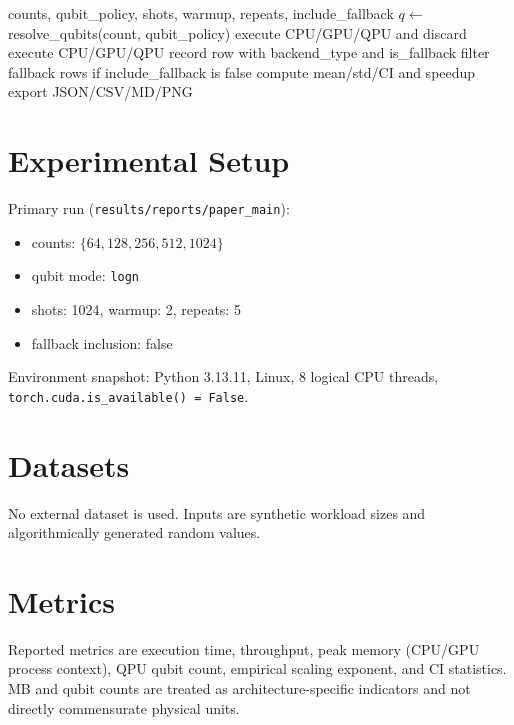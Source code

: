 \documentclass[10pt,conference]{IEEEtran}
\begin{document}
\begin{algorithm}[t]
\caption{Repeated Cross-Platform RNG Benchmark}
\begin{algorithmic}[1]
\Require counts, qubit\_policy, shots, warmup, repeats, include\_fallback
  \State $q \gets$ resolve\_qubits(count, qubit\_policy)
    \State execute CPU/GPU/QPU and discard
  \EndFor
    \State execute CPU/GPU/QPU
    \State record row with backend\_type and is\_fallback
  \EndFor
\EndFor
\State filter fallback rows if include\_fallback is false
\State compute mean/std/CI and speedup
\State export JSON/CSV/MD/PNG
\end{algorithmic}
\end{algorithm}

\section{Experimental Setup}
Primary run (\texttt{results/reports/paper\_main}):
\begin{itemize}
\item counts: $\{64,128,256,512,1024\}$
\item qubit mode: \texttt{logn}
\item shots: 1024, warmup: 2, repeats: 5
\item fallback inclusion: false
\end{itemize}

Environment snapshot: Python 3.13.11, Linux, 8 logical CPU threads, \texttt{torch.cuda.is\_available() = False}.

\section{Datasets}
No external dataset is used. Inputs are synthetic workload sizes and algorithmically generated random values.

\section{Metrics}
Reported metrics are execution time, throughput, peak memory (CPU/GPU process context), QPU qubit count, empirical scaling exponent, and CI statistics. MB and qubit counts are treated as architecture-specific indicators and not directly commensurate physical units.
\end{document}
